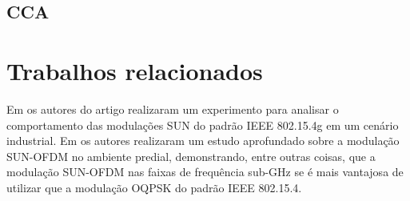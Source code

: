 \subsection*{CCA}

\section{Trabalhos relacionados}
Em \cite{tuset2020dataset} os autores do artigo realizaram um experimento para analisar o comportamento das modulações SUN do padrão IEEE 802.15.4g em um cenário industrial. Em  \cite{munoz2018overview} os autores realizaram um estudo aprofundado sobre a modulação SUN-OFDM no ambiente predial, demonstrando, entre outras coisas, que a modulação SUN-OFDM nas faixas de frequência sub-GHz se é mais vantajosa de utilizar que a modulação OQPSK do padrão IEEE 802.15.4.
